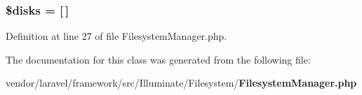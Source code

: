 \subsubsection[{\$disks}]{\setlength{\rightskip}{0pt plus 5cm}\$disks = [$\,$]\hspace{0.3cm}{\ttfamily [protected]}}\label{class_illuminate_1_1_filesystem_1_1_filesystem_manager_a2354949158401a1c1d6835b4e1df0b89}


Definition at line 27 of file Filesystem\+Manager.\+php.



The documentation for this class was generated from the following file\+:\begin{DoxyCompactItemize}
\item 
vendor/laravel/framework/src/\+Illuminate/\+Filesystem/{\bf Filesystem\+Manager.\+php}\end{DoxyCompactItemize}
